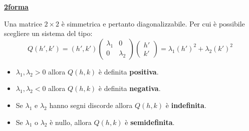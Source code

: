 \documentclass[a4paper]{article}
\newcommand{\definition}[1]{\textcolor{Red3}{\textbf{#1}}}
\newcommand{\example}[1]{\textcolor{Green4}{\textbf{#1}}}
\begin{document}
	\begin{flushleft}
		\example{\textbf{\underline{2\degree forma}}}
	\end{flushleft}
	Una matrice $2 \times 2$ è simmetrica e pertanto diagonalizzabile. Per cui è possibile scegliere un sistema del tipo:
	\begin{equation}\label{eq: 2a forma quadratica}
		Q\left(h', k'\right) = 
		\left(h', k'\right)
		\begin{pmatrix}
			\lambda_{1} & 0 \\ 0 & \lambda_{2}
		\end{pmatrix}
		\begin{pmatrix}
			h' \\ k'
		\end{pmatrix}
		=
		\lambda_{1} \left(h'\right)^{2} + \lambda_{2} \left(k'\right)^{2}
	\end{equation}
	\begin{boxdef}
		\begin{itemize}
			\item $\lambda_{1}, \lambda_{2} > 0$ allora $Q\left(h,k\right)$ è definita \definition{positiva}.
			
			\item $\lambda_{1}, \lambda_{2} < 0$ allora $Q\left(h,k\right)$ è definita \definition{negativa}.

			\item Se $\lambda_{1}$ e $\lambda_{2}$ hanno segni discorde allora $Q\left(h,k\right)$ è \definition{indefinita}.
			
			\item Se $\lambda_{1}$ o $\lambda_{2}$ è nullo, allora $Q\left(h,k\right)$ è \definition{semidefinita}.
		\end{itemize}
	\end{boxdef}\newpage
\end{document}
